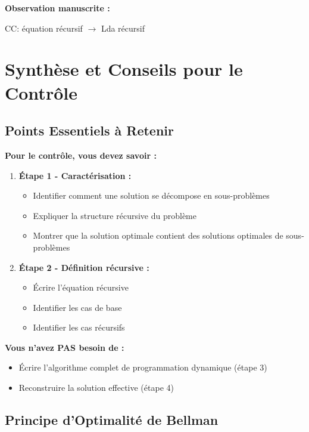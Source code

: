 \documentclass[12pt,a4paper]{article}
\begin{document}
\begin{notecours}
\textbf{Observation manuscrite :}

CC: équation récursif $\rightarrow$ Lda récursif
\end{notecours}

\newpage
\section{Synthèse et Conseils pour le Contrôle}

\subsection{Points Essentiels à Retenir}

\begin{important}
\textbf{Pour le contrôle, vous devez savoir :}

\begin{enumerate}
    \item \textbf{Étape 1 - Caractérisation :}
    \begin{itemize}
        \item Identifier comment une solution se décompose en sous-problèmes
        \item Expliquer la structure récursive du problème
        \item Montrer que la solution optimale contient des solutions optimales de sous-problèmes
    \end{itemize}
    
    \item \textbf{Étape 2 - Définition récursive :}
    \begin{itemize}
        \item Écrire l'équation récursive
        \item Identifier les cas de base
        \item Identifier les cas récursifs
    \end{itemize}
\end{enumerate}

\textbf{Vous n'avez PAS besoin de :}
\begin{itemize}
    \item Écrire l'algorithme complet de programmation dynamique (étape 3)
    \item Reconstruire la solution effective (étape 4)
\end{itemize}
\end{important}

\subsection{Principe d'Optimalité de Bellman}
\end{document}
